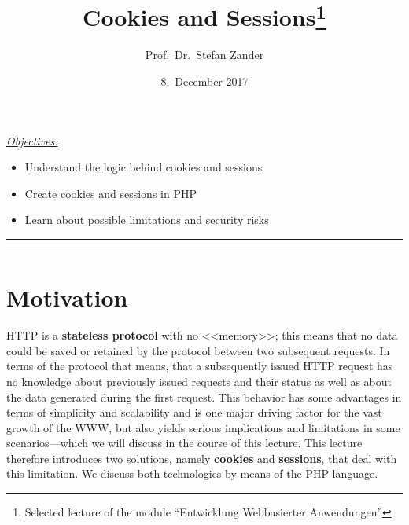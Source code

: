 \documentclass[a4paper, justified, notoc]{tufte-handout} %
\title{Cookies and Sessions\thanks{Selected lecture of the module ``Entwicklung Webbasierter Anwendungen''}}
\author[opt Author]{Prof.\ Dr.\ Stefan Zander}
\date{8.\ December 2017}  %
\newenvironment{lernziele}{
	\begin{mdframed}[hidealllines=true,backgroundcolor=gray!20] 
	\small \itshape
	\noindent \underline{Objectives:} 
	} 
	{ 
	\end{mdframed}
}
\begin{document}
\maketitle%


\begin{lernziele}
\begin{itemize}
	\item Understand the logic behind cookies and sessions
	\item Create cookies and sessions in PHP
	\item Learn about possible limitations and security risks
\end{itemize}
\end{lernziele}


\setcounter{secnumdepth}{2} %

\noindent \rule{1.54\textwidth}{0.4pt}
\tableofcontents
\noindent \rule{1.54\textwidth}{0.4pt}

\section{Motivation}\label{sec:motivation}

HTTP is a \textbf{stateless protocol} with no <<memory>>; this means that no data could be saved or retained by the protocol between two subsequent requests. In terms of the protocol that means, that a subsequently issued HTTP request has no knowledge about previously issued requests and their status as well as about the data generated during the first request. This behavior has some advantages in terms of simplicity and scalability and is one major driving factor for the vast growth of the WWW, but also yields serious implications and limitations in some scenarios---which we will discuss in the course of this lecture. This lecture therefore introduces two solutions, namely \textbf{cookies} and \textbf{sessions}, that deal with this limitation. We discuss both technologies by means of the PHP language.
\end{document}
